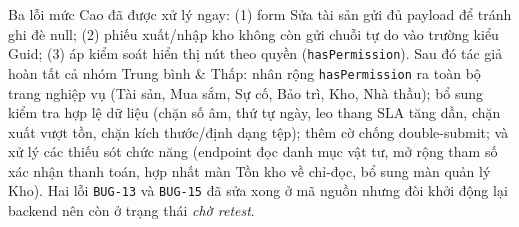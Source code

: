 \smallskip
\noindent Ba lỗi mức Cao đã được xử lý ngay: (1) form Sửa tài sản gửi đủ payload để tránh ghi đè null; (2) phiếu xuất/nhập kho không còn gửi chuỗi tự do vào trường kiểu Guid; (3) áp kiểm soát hiển thị nút theo quyền (\texttt{hasPermission}). Sau đó tác giả hoàn tất cả nhóm Trung bình \& Thấp: nhân rộng \texttt{hasPermission} ra toàn bộ trang nghiệp vụ (Tài sản, Mua sắm, Sự cố, Bảo trì, Kho, Nhà thầu); bổ sung kiểm tra hợp lệ dữ liệu (chặn số âm, thứ tự ngày, leo thang SLA tăng dần, chặn xuất vượt tồn, chặn kích thước/định dạng tệp); thêm cờ chống double-submit; và xử lý các thiếu sót chức năng (endpoint đọc danh mục vật tư, mở rộng tham số xác nhận thanh toán, hợp nhất màn Tồn kho về chỉ-đọc, bổ sung màn quản lý Kho). Hai lỗi \texttt{BUG-13} và \texttt{BUG-15} đã sửa xong ở mã nguồn nhưng đòi khởi động lại backend nên còn ở trạng thái \emph{chờ retest}.

